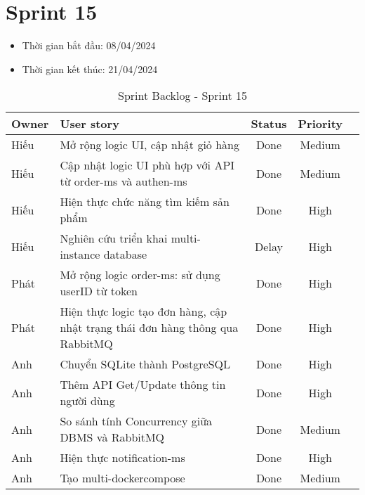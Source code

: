 \section{Sprint 15}
\begin{itemize}
    \item Thời gian bắt đầu: 08/04/2024
    \item Thời gian kết thúc: 21/04/2024
\end{itemize}
\begin{table}[H]
    \begin{tabular}{|m{2.5cm}|m{9cm}|c|c|c|}
    \hline
    \textbf{Owner}  & \textbf{User story}                                & \textbf{Status}  & \textbf{Priority} \\ \hline
    Hiếu                & Mở rộng logic UI, cập nhật giỏ hàng                   & Done                              & Medium         \\ \hline
    Hiếu               & Cập nhật logic UI phù hợp với API từ order-ms và authen-ms                   & Done                              & Medium         \\ \hline
    Hiếu                & Hiện thực chức năng tìm kiếm sản phẩm                 & Done                              & High         \\ \hline
    Hiếu               & Nghiên cứu triển khai multi-instance database                     & Delay                             & High         \\ \hline
    Phát               & Mở rộng logic order-ms: sử dụng userID từ token                     & Done                              & High         \\ \hline
    Phát               & Hiện thực logic tạo đơn hàng, cập nhật trạng thái đơn hàng thông qua RabbitMQ                     & Done                              & High         \\ \hline
    Anh               & Chuyển SQLite thành PostgreSQL                   & Done                              & High         \\ \hline
    Anh               & Thêm API Get/Update thông tin người dùng                   & Done                              & High         \\ \hline
    Anh               & So sánh tính Concurrency giữa DBMS và RabbitMQ                     & Done                              & Medium        \\ \hline
    Anh               & Hiện thực notification-ms                  & Done                              & High         \\ \hline
    Anh              & Tạo multi-dockercompose                     & Done                              & Medium        \\ \hline
    \end{tabular}
    \caption{Sprint Backlog - Sprint 15}
    \label{tab:sprint-15}
\end{table}

